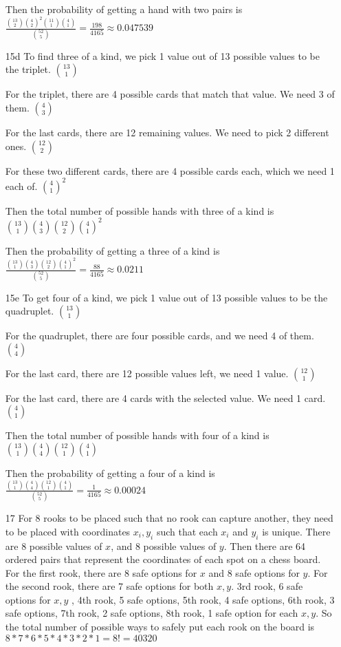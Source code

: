 \documentclass[11pt]{article}
\begin{document}
\begin{itemize}
  Then the probability of getting a hand with two pairs is $\frac{\binom{13}{2}{\binom{4}{2}}^2 \binom{11}{1}\binom{4}{1}}{\binom{52}{5}} = \frac{198}{4165} \approx 0.047539$

\item[15d]
  To find three of a kind, we pick 1 value out of 13 possible values to be the triplet. $\binom{13}{1}$

  For the triplet, there are 4 possible cards that match that value. We need 3 of them. $\binom{4}{3}$

  For the last cards, there are 12 remaining values. We need to pick 2 different ones. $\binom{12}{2}$

  For these two different cards, there are 4 possible cards each, which we need 1 each of. ${\binom{4}{1}}^2$

  Then the total number of possible hands with three of a kind is $\binom{13}{1}\binom{4}{3}\binom{12}{2}{\binom{4}{1}}^2$

  Then the probability of getting a three of a kind is $\frac{\binom{13}{1}\binom{4}{3}\binom{12}{2}{\binom{4}{1}}^2}{\binom{52}{5}} = \frac{88}{4165} \approx 0.0211$

\item[15e]
  To get four of a kind, we pick 1 value out of 13 possible values to be the quadruplet. $\binom{13}{1}$

  For the quadruplet, there are four possible cards, and we need 4 of them. $\binom{4}{4}$

  For the last card, there are 12 possible values left, we need 1 value. $\binom{12}{1}$

  For the last card, there are 4 cards with the selected value. We need 1 card. $\binom{4}{1}$

  Then the total number of possible hands with four of a kind is $\binom{13}{1}\binom{4}{4}\binom{12}{1}\binom{4}{1}$

  Then the probability of getting a four of a kind is $\frac{\binom{13}{1}\binom{4}{4}\binom{12}{1}\binom{4}{1}}{\binom{52}{5}} = \frac{1}{4165} \approx 0.00024$

\item[17]
  For 8 rooks to be placed such that no rook can capture another, they need to be placed with coordinates $x_i,y_i$ such that each $x_i$ and $y_i$ is unique. There are 8 possible values of $x$, and 8 possible values of $y$. Then there are 64 ordered pairs that represent the coordinates of each spot on a chess board.
  For the first rook, there are 8 safe options for $x$ and 8 safe options for $y$. For the second rook, there are 7 safe options for both $x,y$. 3rd rook, 6 safe options for $x,y$ , 4th rook, 5 safe options, 5th rook, 4 safe options, 6th rook, 3 safe options, 7th rook, 2 safe options, 8th rook, 1 safe option for each $x,y$. So the total number of possible ways to safely put each rook on the board is $8 * 7 * 6 * 5 * 4 * 3 * 2 * 1 = 8! = 40320$


\end{itemize}
\end{document}
